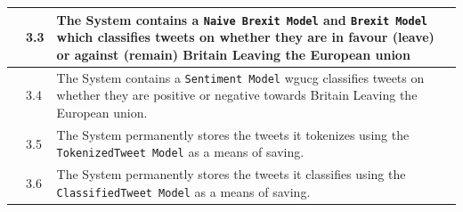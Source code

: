 \documentclass[11pt]{report}
\begin{document}
\begin{landscape}
\begin{table}[]
\begin{tabular}{ |>{\raggedright\arraybackslash}p{3.75cm}|p{1cm}|>{\raggedright\arraybackslash}p{14cm}|}
                                 \cline{2-3}
                                  & 3.3         &  The System contains a \texttt{Naive Brexit Model} and \texttt{Brexit Model} which classifies tweets on whether they are in favour (leave) or against (remain) Britain Leaving the European union \\
                                  \cline{2-3}
                                  & 3.4         &  The System contains a \texttt{Sentiment Model} wgucg classifies tweets on whether they are positive or negative towards
Britain Leaving the European union.\\
                                 \cline{2-3}
                                  & 3.5         &  The System permanently stores the tweets it tokenizes using the \texttt{TokenizedTweet Model} as a means of saving.\\
                                  \cline{2-3}
                                  & 3.6         &  The System permanently stores the tweets it classifies using the \texttt{ClassifiedTweet Model} as a means of saving.\\


\end{tabular}
\end{table}
\end{landscape}
\end{document}

